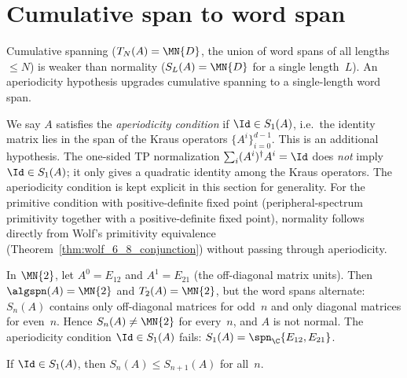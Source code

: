 \section{Cumulative span to word span}\label{sec:cumspan_to_wordspan}

Cumulative spanning ($T_N(A) = \MN{D}$, the union of word spans
of all lengths~$\le N$) is weaker than normality
($S_L(A) = \MN{D}$ for a single length~$L$).
An aperiodicity hypothesis upgrades cumulative spanning to a single-length word
span.

\begin{remark}\label{rem:aperiodicity}\leanok
    We say $A$ satisfies the \emph{aperiodicity condition}
    if $\Id \in S_1(A)$, i.e.\ the identity matrix lies in the
    span of the Kraus operators $\{A^i\}_{i=0}^{d-1}$.
    This is an additional hypothesis. The one-sided TP normalization
    $\sum_i (A^i)^\dagger A^i = \Id$ does \emph{not} imply
    $\Id \in S_1(A)$; it only gives a quadratic identity among the
    Kraus operators.
    The aperiodicity condition is kept explicit in this section for
    generality.
    For the primitive condition with positive-definite fixed point
    (peripheral-spectrum primitivity together with a positive-definite
    fixed point), normality follows directly from Wolf's primitivity
    equivalence (Theorem~\ref{thm:wolf_6_8_conjunction}) without passing
    through aperiodicity.
\end{remark}

\begin{remark}%
    \label{rem:cumspan_counterexample}\leanok
    In $\MN{2}$, let $A^0 = E_{12}$ and $A^1 = E_{21}$
    (the off-diagonal matrix units).
    Then $\algspn(A) = \MN{2}$ and $T_2(A) = \MN{2}$,
    but the word spans alternate:
    $S_n(A)$ contains only off-diagonal matrices for odd~$n$
    and only diagonal matrices for even~$n$.
    Hence $S_n(A) \neq \MN{2}$ for every~$n$,
    and $A$ is not normal.
    The aperiodicity condition $\Id \in S_1(A)$ fails:
    $S_1(A) = \spn_{\C}\{E_{12}, E_{21}\}$.
\end{remark}

\begin{theorem}%
    \label{thm:wordspan_mono_aperiodic}
    \leanok
    If $\Id \in S_1(A)$, then
    $S_n(A) \le S_{n+1}(A)$ for all~$n$.
\end{theorem}

